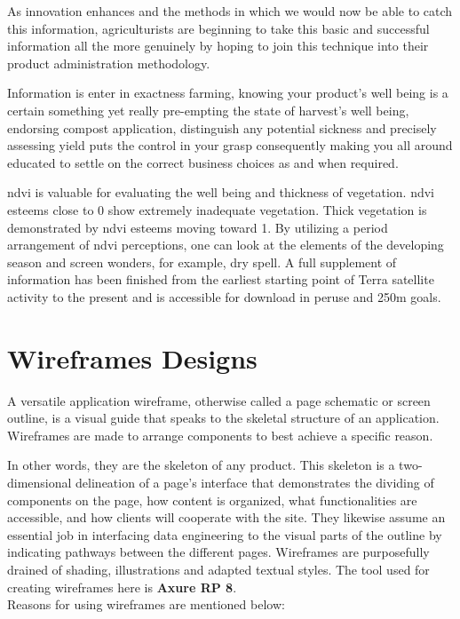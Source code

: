 As innovation enhances and the methods in which we would now be able to catch this information, agriculturists are beginning to take this basic and successful information all the more genuinely by hoping to join this technique into their product administration methodology. 

Information is enter in exactness farming, knowing your product's well being is a certain something yet really pre-empting the state of harvest's well being, endorsing compost application, distinguish any potential sickness and precisely assessing yield puts the control in your grasp consequently making you all around educated to settle on the correct business choices as and when required.

\gls{ndvi} is valuable for evaluating the well being and thickness of vegetation. \gls{ndvi} esteems close to 0 show extremely inadequate vegetation. Thick vegetation is demonstrated by \gls{ndvi} esteems moving toward 1. By utilizing a period arrangement of \gls{ndvi} perceptions, one can look at the elements of the developing season and screen wonders, for example, dry spell. A full supplement of information has been finished from the earliest starting point of Terra satellite activity to the present and is accessible for download in peruse and 250m goals.


\section{Wireframes Designs}

A versatile application wireframe, otherwise called a page schematic or screen outline, is a visual guide that speaks to the skeletal structure of an application. Wireframes are made to arrange components to best achieve a specific reason.

In other words, they are the skeleton of any product. This skeleton is a two-dimensional delineation of a page's interface that demonstrates the dividing of components on the page, how content is organized, what functionalities are accessible, and how clients will cooperate with the site. They likewise assume an essential job in interfacing data engineering to the visual parts of the outline by indicating pathways between the different pages. Wireframes are purposefully drained of shading, illustrations and adapted textual styles. The tool used for creating wireframes here is \textbf{Axure RP 8}. \\

Reasons for using wireframes are mentioned below:

